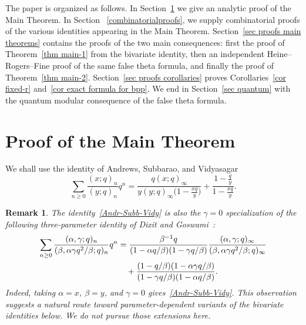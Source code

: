 \documentclass[10pt,a4paper]{amsart}
\newtheorem{remark}{{\bf Remark}}
\numberwithin{equation}{section}
\newcommand{\fr}{\frac}
\begin{document}
The paper is organized as follows. In Section~\ref{sec proof master} we give an analytic proof of the Main Theorem. In Section ~\ref{combinatorialproofs}, we supply combinatorial proofs of the various identities appearing in the Main Theorem. Section~\ref{sec proofs main theorems} contains the proofs of the two main consequences: first the proof of Theorem~\ref{thm main-1} from the bivariate identity, then an independent Heine--Rogers--Fine proof of the same false theta formula, and finally the proof of Theorem~\ref{thm main-2}. Section~\ref{sec proofs corollaries} proves Corollaries~\ref{cor fixed-r} and~\ref{cor exact formula for bpp}. We end in Section~\ref{sec quantum} with the quantum modular consequence of the false theta formula.
%
\section{Proof of the Main Theorem}\label{sec proof master}
%
We shall use the identity of Andrews, Subbarao, and Vidyasagar~\cite{And-Sub-Vid}
\begin{equation}\label{Andr-Subb-Vidy}
\sum_{n\geq 0} \fr{(x;q)_n}{(y;q)_n} q^n
=\fr{q(x;q)_\infty}{y(y;q)_\infty \big(1-\fr{xq}{y}\big)} + \fr{1-\fr{q}{y}}{1-\fr{xq}{y}}.
\end{equation}

\begin{remark}\label{rem DG specialization}
The identity~\eqref{Andr-Subb-Vidy} is also the $\gamma=0$ specialization of the following three-parameter identity of Dixit and Goswami~\cite[Theorem~1.3]{Dixit-Goswami}:
\begin{align}
\sum_{n\ge 0}\frac{(\alpha,\gamma;q)_n}{(\beta,\alpha\gamma q^2/\beta;q)_n}q^n
&=\frac{\beta^{-1}q}{(1-\alpha q/\beta)(1-\gamma q/\beta)}
\frac{(\alpha,\gamma;q)_\infty}{(\beta,\alpha\gamma q^2/\beta;q)_\infty} \notag\\
&\quad+\frac{(1-q/\beta)(1-\alpha\gamma q/\beta)}{(1-\gamma q/\beta)(1-\alpha q/\beta)}. \label{eq DG three parameter}
\end{align}
Indeed, taking $\alpha=x$, $\beta=y$, and $\gamma=0$ gives~\eqref{Andr-Subb-Vidy}.  This observation suggests a natural route toward parameter-dependent variants of the bivariate identities below.  We do not pursue those extensions here.
\end{remark}
\end{document}
